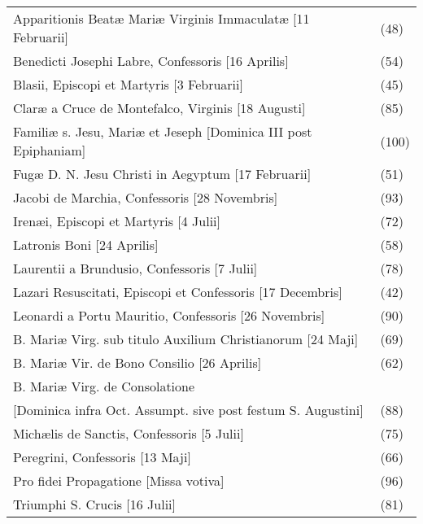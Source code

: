 \begin{table}[ht]
\begin{tabular}{@{}ll@{}}
Apparitionis Beatæ Mariæ Virginis Immaculatæ [11 Februarii]              & (48)       \\
Benedicti Josephi Labre, Confessoris [16 Aprilis]                        & (54)       \\
Blasii, Episcopi et Martyris [3 Februarii]                               & (45)       \\
Claræ a Cruce de Montefalco, Virginis [18 Augusti]                       & (85)       \\
Familiæ s. Jesu, Mariæ et Jeseph [Dominica III post Epiphaniam]          & (100)      \\
Fugæ D. N. Jesu Christi in Aegyptum [17 Februarii]                       & (51)       \\
Jacobi de Marchia, Confessoris [28 Novembris]                            & (93)       \\
Irenæi, Episcopi et Martyris [4 Julii]                                   & (72)       \\
Latronis Boni [24 Aprilis]                                               & (58)       \\
Laurentii a Brundusio, Confessoris [7 Julii]                             & (78)       \\
Lazari Resuscitati, Episcopi et Confessoris [17 Decembris]               & (42)       \\
Leonardi a Portu Mauritio, Confessoris [26 Novembris]                    & (90)       \\
B. Mariæ Virg. sub titulo Auxilium Christianorum [24 Maji]               & (69)       \\
B. Mariæ Vir. de Bono Consilio [26 Aprilis]                              & (62)       \\
B. Mariæ Virg. de Consolatione                                           &            \\
\hspace*{2em}[Dominica infra Oct. Assumpt. sive post festum S. Augustini] & (88)       \\
Michælis de Sanctis, Confessoris [5 Julii]                               & (75)       \\
Peregrini, Confessoris [13 Maji]                                         & (66)       \\
Pro fidei Propagatione [Missa votiva]                                    & (96)       \\
Triumphi S. Crucis [16 Julii]                                            & (81)       \\ \bottomrule
\end{tabular}
\end{table}

\vspace*{\fill}
